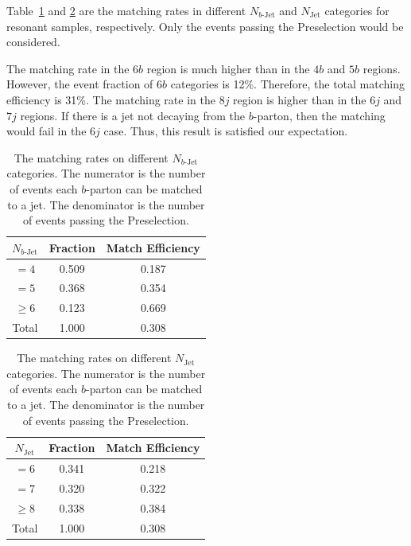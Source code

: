 \documentclass[12pt]{article}
\begin{document}
    Table~\ref{tab:resonant_match_rate_nbj} and \ref{tab:resonant_match_rate_nj} are the matching rates in different $N_{b\text{-Jet}}$ and $N_{\text{Jet}}$ categories for resonant samples, respectively. Only the events passing the Preselection would be considered.

    The matching rate in the $6b$ region is much higher than in the $4b$ and $5b$ regions. However, the event fraction of $6b$ categories is 12\%. Therefore, the total matching efficiency is 31\%. The matching rate in the $8j$ region is higher than in the $6j$ and $7j$ regions. If there is a jet not decaying from the $b$-parton, then the matching would fail in the $6j$ case. Thus, this result is satisfied our expectation.
    \begin{table}[htpb]
		\centering
        \caption{The matching rates on different $N_{b\text{-Jet}}$ categories. The numerator is the number of events each $b$-parton can be matched to a jet. The denominator is the number of events passing the Preselection.}
		\label{tab:resonant_match_rate_nbj}
		\begin{tabular}{c|c|c}
        $N_{b\text{-Jet}}$    & Fraction  & Match Efficiency     \\ \hline
        $=4$                  & 0.509 & 0.187 \\
        $=5$                  & 0.368 & 0.354 \\
        $\ge 6$               & 0.123 & 0.669 \\ \hline
        Total                 & 1.000 & 0.308
		\end{tabular}
	\end{table}
    \begin{table}[htpb]
		\centering
        \caption{The matching rates on different $N_{\text{Jet}}$ categories. The numerator is the number of events each $b$-parton can be matched to a jet. The denominator is the number of events passing the Preselection.}
		\label{tab:resonant_match_rate_nj}
		\begin{tabular}{c|c|c}
        $N_{\text{Jet}}$    & Fraction  & Match Efficiency     \\ \hline
        $=6$                  & 0.341 & 0.218 \\
        $=7$                  & 0.320 & 0.322 \\
        $\ge 8$               & 0.338 & 0.384 \\ \hline
        Total                 & 1.000 & 0.308
		\end{tabular}
	\end{table}
\end{document}
